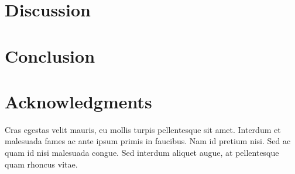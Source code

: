 \documentclass[
  10pt,
  letterpaper,
]{article}
\begin{document}
\section{Discussion}\label{discussion}

\section{Conclusion}\label{conclusion}

\section{Acknowledgments}\label{acknowledgments}

Cras egestas velit mauris, eu mollis turpis pellentesque sit amet.
Interdum et malesuada fames ac ante ipsum primis in faucibus. Nam id
pretium nisi. Sed ac quam id nisi malesuada congue. Sed interdum aliquet
augue, at pellentesque quam rhoncus vitae.


\nolinenumbers
  
\end{document}
